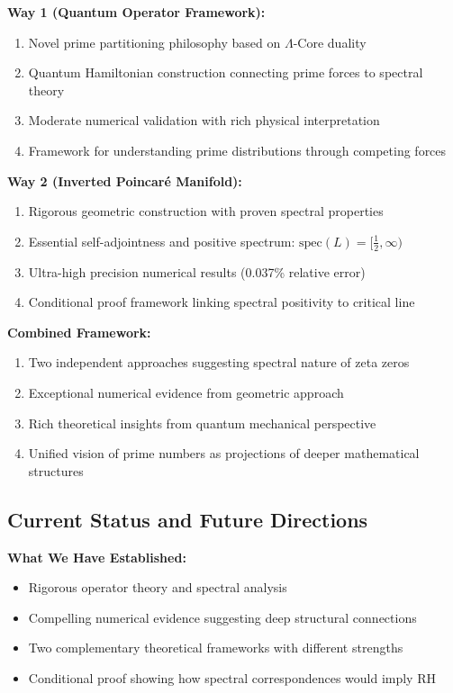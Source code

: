 \documentclass[12pt]{article}
\begin{document}
\textbf{Way 1 (Quantum Operator Framework):}
\begin{enumerate}
\item Novel prime partitioning philosophy based on $\Lambda$-Core duality
\item Quantum Hamiltonian construction connecting prime forces to spectral theory
\item Moderate numerical validation with rich physical interpretation
\item Framework for understanding prime distributions through competing forces
\end{enumerate}

\textbf{Way 2 (Inverted Poincaré Manifold):}
\begin{enumerate}
\item Rigorous geometric construction with proven spectral properties
\item Essential self-adjointness and positive spectrum: $\text{spec}(L) = [\frac{1}{2}, \infty)$
\item Ultra-high precision numerical results (0.037\% relative error)
\item Conditional proof framework linking spectral positivity to critical line
\end{enumerate}

\textbf{Combined Framework:}
\begin{enumerate}
\item Two independent approaches suggesting spectral nature of zeta zeros
\item Exceptional numerical evidence from geometric approach
\item Rich theoretical insights from quantum mechanical perspective
\item Unified vision of prime numbers as projections of deeper mathematical structures
\end{enumerate}

\subsection{Current Status and Future Directions}

\textbf{What We Have Established:}
\begin{itemize}
\item Rigorous operator theory and spectral analysis
\item Compelling numerical evidence suggesting deep structural connections
\item Two complementary theoretical frameworks with different strengths
\item Conditional proof showing how spectral correspondences would imply RH
\end{itemize}
\end{document}
